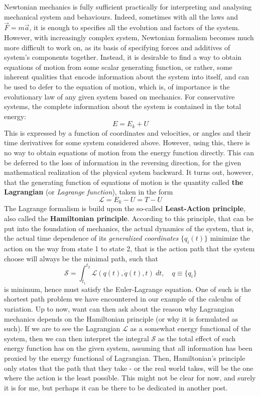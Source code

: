 Newtonian mechanics is fully sufficient practically for interpreting and analysing mechanical system and behaviours. Indeed, sometimes with all the laws and $\vec{F}=m\vec{a}$, it is enough to specifies all the evolution and factors of the system. However, with increasingly complex system, Newtonian formalism becomes much more difficult to work on, as its basis of specifying forces and additives of system's components together. Instead, it is desirable to find a way to obtain equations of motion from some scalar generating function, or rather, some inherent qualities that encode information about the system into itself, and can be used to defer to the equation of motion, which is, of importance is the evolutionary law of any given system based on mechanics. For conservative systems, the complete information about the system is contained in the total energy: 
$$
E= E_{k} + U
$$
This is expressed by a function of coordinates and velocities, or angles and their time derivatives for some system considered above. However, using this, there is no way to obtain equations of motion from the energy function directly. This can be deferred to the loss of information in the reversing direction, for the given mathematical realization of the physical system backward. It turns out, however, that the generating function of equations of motion is the quantity called \textbf{the Lagrangian} (or \textit{Lagrange function}), taken in the form 
$$
\mathcal{L} = E_{k} - U = T- U
$$
The Lagrange formalism is build upon the so-called \textbf{Least-Action principle}, also called the \textbf{Hamiltonian principle}. According to this principle, that can be put into the foundation of mechanics, the actual dynamics of the system, that is, the actual time dependence of its \textit{generalized coordinates} $\{q_{i}(t)\}$ minimize the action on the way from state 1 to state 2, that is the action path that the system choose will always be the minimal path, such that 
$$
\mathcal{S} = \int_{t_1}^{t_2} \mathcal{L}(q(t),\dot{q}(t),t) \: dt , \quad q\equiv \{q_{i}\}
$$
is minimum, hence must satisfy the Euler-Lagrange equation. One of such is the shortest path problem we have encountered in our example of the calculus of variation. Up to now, want can then ask about the reason why Lagrangian mechanics depends on the Hamiltonian principle (or why it is formulated as such). If we are to see the Lagrangian $\mathcal{L}$ as a somewhat energy functional of the system, then we can then interpret the integral $\mathcal{S}$ as the total effect of such energy function has on the given system, assuming that all information has been proxied by the energy functional of Lagrangian. Then, Hamiltonian's principle only states that the path that they take - or the real world takes, will be the one where the action is the least possible. This might not be clear for now, and surely it is for me, but perhaps it can be there to be dedicated in another post. 

